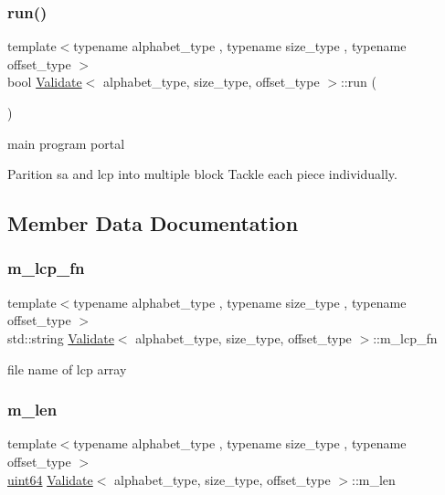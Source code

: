 \mbox{\label{class_validate_ab94f0feab53136b137c432332efa1ff3}} 
\subsubsection{\texorpdfstring{run()}{run()}}
{\footnotesize\ttfamily template$<$typename alphabet\+\_\+type , typename size\+\_\+type , typename offset\+\_\+type $>$ \\
bool \hyperlink{class_validate}{Validate}$<$ alphabet\+\_\+type, size\+\_\+type, offset\+\_\+type $>$\+::run (\begin{DoxyParamCaption}{ }\end{DoxyParamCaption})\hspace{0.3cm}{\ttfamily [inline]}}



main program portal 

Parition sa and lcp into multiple block Tackle each piece individually. 

\subsection{Member Data Documentation}
\mbox{\label{class_validate_a8bbe1b0a3990ebae85d352bcce9da755}} 
\subsubsection{\texorpdfstring{m\+\_\+lcp\+\_\+fn}{m\_lcp\_fn}}
{\footnotesize\ttfamily template$<$typename alphabet\+\_\+type , typename size\+\_\+type , typename offset\+\_\+type $>$ \\
std\+::string \hyperlink{class_validate}{Validate}$<$ alphabet\+\_\+type, size\+\_\+type, offset\+\_\+type $>$\+::m\+\_\+lcp\+\_\+fn\hspace{0.3cm}{\ttfamily [private]}}



file name of lcp array 

\mbox{\label{class_validate_a49a048e8046e03c3fbc7251bb9af87fd}} 
\subsubsection{\texorpdfstring{m\+\_\+len}{m\_len}}
{\footnotesize\ttfamily template$<$typename alphabet\+\_\+type , typename size\+\_\+type , typename offset\+\_\+type $>$ \\
\hyperlink{types_8h_a60e8696a4678cd348e991a1f172e53f7}{uint64} \hyperlink{class_validate}{Validate}$<$ alphabet\+\_\+type, size\+\_\+type, offset\+\_\+type $>$\+::m\+\_\+len\hspace{0.3cm}{\ttfamily [private]}}



